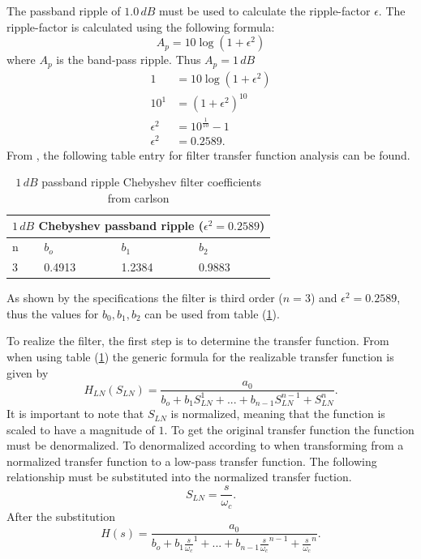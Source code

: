 \documentclass[a4paper, onecolumn, 12pt]{IEEEtran}
\begin{document}
  The passband ripple of $1.0\,dB$ must be used to calculate the ripple-factor $\epsilon$. The ripple-factor is calculated using the following formula: 
  \begin{equation}
  \label{eqn:ripple_factor}
     A_p = 10\log(1+\epsilon^2)
  \end{equation}
  where $A_p$ is the band-pass ripple. Thus $A_p = 1\,dB$
  \begin{align*}
    1 &= 10\log(1+\epsilon^2) \\
    10^1 &= (1+\epsilon^2)^{10} \\
    \epsilon^2 &= 10^{\frac{1}{10}}-1 \\
    \epsilon^2 &= 0.2589.
  \end{align*}
  From \cite{carlson}, the following table entry for filter transfer function analysis can be found. 
    \begin{table}[H] 
      \centering 
      \caption{$1\,dB$ passband ripple Chebyshev filter coefficients from carlson}
      \begin{tabular}{|m{2cm}|m{2cm}|m{2cm}|m{2cm}|}
      \hline
        \multicolumn{4}{|c|}{$1\,dB$ Chebyshev passband ripple ($\epsilon^2=0.2589$)} \\ \hline
        n & $b_o$ & $b_1$ & $b_2$ \\ \hline 
        3 & 0.4913& 1.2384& 0.9883\\ \hline
      \end{tabular}
      
      \label{tbl:carlson_chebychev}
    \end{table}
    As shown by the specifications the filter is third order ($n=3$) and $\epsilon^2 = 0.2589$, thus the values for $b_0,b_1,b_2$ can be used from table (\ref{tbl:carlson_chebychev}).

    To realize the filter, the first step is to determine the transfer function. From \cite{carlson} when using table (\ref{tbl:carlson_chebychev}) the generic formula for the realizable transfer function is given by
    \begin{equation}
      H_{LN}(S_{LN}) = \frac{a_0}{b_o + b_1S_{LN}^{1} + ... + b_{n-1}S_{LN}^{n-1} + S_{LN}^{n}}
      \label{eqn:Hf_generic_norm}.
    \end{equation}
    It is important to note that $S_{LN}$ is normalized, meaning that the function is scaled to have a magnitude of $1$.
    To get the original transfer function the function must be denormalized. To denormalized according to \cite{carlson} when transforming from a normalized transfer function to a low-pass transfer function. The following relationship must be substituted into the normalized transfer fuction.
    \begin{equation}
      S_{LN} = \frac{s}{\omega_c}.
      \label{eqn:denorm}
    \end{equation}
    After the substitution 
    \begin{equation}
      H(s) = \frac{a_0}{b_o + b_1 \frac{s}{\omega_c}^{1} + ... + b_{n-1}\frac{s}{\omega_c}^{n-1} + \frac{s}{\omega_c}^{n}}.
      \label{eqn:Hf_generic_denorm}
    \end{equation}
    
\end{document}
